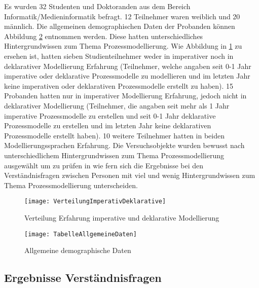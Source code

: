 Es wurden 32 Studenten und Doktoranden aus dem Bereich Informatik/Medieninformatik befragt. 12 Teilnehmer waren weiblich und 20 männlich. Die allgemeinen demographischen Daten der Probanden können Abbildung \ref{fig:TabelleAllgemeineDaten} entnommen werden. Diese hatten unterschiedliches Hintergrundwissen zum Thema Prozessmodellierung. Wie Abbildung in \ref{fig:VerteilungImperativDeklarative} zu ersehen ist, hatten sieben Studienteilnehmer weder in imperativer noch in deklarativer Modellierung Erfahrung (Teilnehmer, welche angaben seit 0-1 Jahr imperative oder deklarative Prozessmodelle zu modellieren und im letzten Jahr keine imperativen oder deklarativen Prozessmodelle erstellt zu haben). 15 Probanden hatten nur in imperativer Modellierung Erfahrung, jedoch nicht in deklarativer Modellierung (Teilnehmer, die angaben seit mehr als 1 Jahr imperative Prozessmodelle zu erstellen und seit 0-1 Jahr deklarative Prozessmodelle zu erstellen und im letzten Jahr keine deklarativen Prozessmodelle erstellt haben). 10 weitere Teilnehmer hatten in beiden Modellierungssprachen Erfahrung. Die Versuchsobjekte wurden bewusst nach unterschiedlichem Hintergrundwissen zum Thema Prozessmodellierung ausgewählt um zu prüfen in wie fern sich die Ergebnisse bei den Verständnisfragen zwischen Personen mit viel und wenig Hintergrundwissen zum Thema Prozessmodellierung unterscheiden.\newline


\begin{figure}[htp]
\begin{center}
  \texttt{[image: VerteilungImperativDeklarative]} %
  \caption{Verteilung Erfahrung imperative und deklarative Modellierung}
  \label{fig:VerteilungImperativDeklarative}
\end{center}
\end{figure}

\begin{figure}[htp]
\begin{center}
  \texttt{[image: TabelleAllgemeineDaten]} %
  \caption{Allgemeine demographische Daten}
  \label{fig:TabelleAllgemeineDaten}
\end{center}
\end{figure}



\subsection{Ergebnisse Verständnisfragen}

